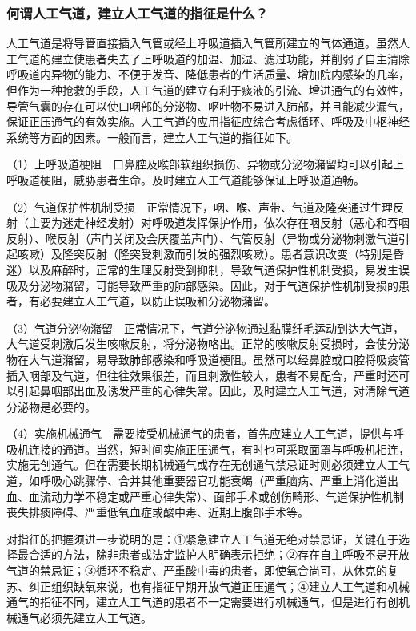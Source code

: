 \subsubsection{何谓人工气道，建立人工气道的指征是什么？}

人工气道是将导管直接插入气管或经上呼吸道插入气管所建立的气体通道。虽然人工气道的建立使患者失去了上呼吸道的加温、加湿、滤过功能，并削弱了自主清除呼吸道内异物的能力、不便于发音、降低患者的生活质量、增加院内感染的几率，但作为一种抢救的手段，人工气道的建立有利于痰液的引流、增进通气的有效性，导管气囊的存在可以使口咽部的分泌物、呕吐物不易进入肺部，并且能减少漏气，保证正压通气的有效实施。人工气道的应用指征应综合考虑循环、呼吸及中枢神经系统等方面的因素。一般而言，建立人工气道的指征如下。

（1）上呼吸道梗阻　口鼻腔及喉部软组织损伤、异物或分泌物潴留均可以引起上呼吸道梗阻，威胁患者生命。及时建立人工气道能够保证上呼吸道通畅。

（2）气道保护性机制受损　正常情况下，咽、喉、声带、气道及隆突通过生理反射（主要为迷走神经发射）对呼吸道发挥保护作用，依次存在咽反射（恶心和吞咽反射）、喉反射（声门关闭及会厌覆盖声门）、气管反射（异物或分泌物刺激气道引起咳嗽）及隆突反射（隆突受刺激而引发的强烈咳嗽）。患者意识改变（特别是昏迷）以及麻醉时，正常的生理反射受到抑制，导致气道保护性机制受损，易发生误吸及分泌物潴留，可能导致严重的肺部感染。因此，对于气道保护性机制受损的患者，有必要建立人工气道，以防止误吸和分泌物潴留。

（3）气道分泌物潴留　正常情况下，气道分泌物通过黏膜纤毛运动到达大气道，大气道受刺激后发生咳嗽反射，将分泌物咯出。正常的咳嗽反射受损时，会使分泌物在大气道潴留，易导致肺部感染和呼吸道梗阻。虽然可以经鼻腔或口腔将吸痰管插入咽部及气道，但往往效果很差，而且刺激性较大，患者不易配合，严重时还可以引起鼻咽部出血及诱发严重的心律失常。因此，及时建立人工气道，对清除气道分泌物是必要的。

（4）实施机械通气　需要接受机械通气的患者，首先应建立人工气道，提供与呼吸机连接的通道。当然，短时间实施正压通气，有时也可采取面罩与呼吸机相连，实施无创通气。但在需要长期机械通气或存在无创通气禁忌证时则必须建立人工气道，如呼吸心跳骤停、合并其他重要器官功能衰竭（严重脑病、严重上消化道出血、血流动力学不稳定或严重心律失常）、面部手术或创伤畸形、气道保护性机制丧失排痰障碍、严重低氧血症或酸中毒、近期上腹部手术等。

对指征的把握须进一步说明的是：①紧急建立人工气道无绝对禁忌证，关键在于选择最合适的方法，除非患者或法定监护人明确表示拒绝；②存在自主呼吸不是开放气道的禁忌证；③循环不稳定、严重酸中毒的患者，即使氧合尚可，从休克的复苏、纠正组织缺氧来说，也有指征早期开放气道正压通气；④建立人工气道和机械通气的指征不同，建立人工气道的患者不一定需要进行机械通气，但是进行有创机械通气必须先建立人工气道。

